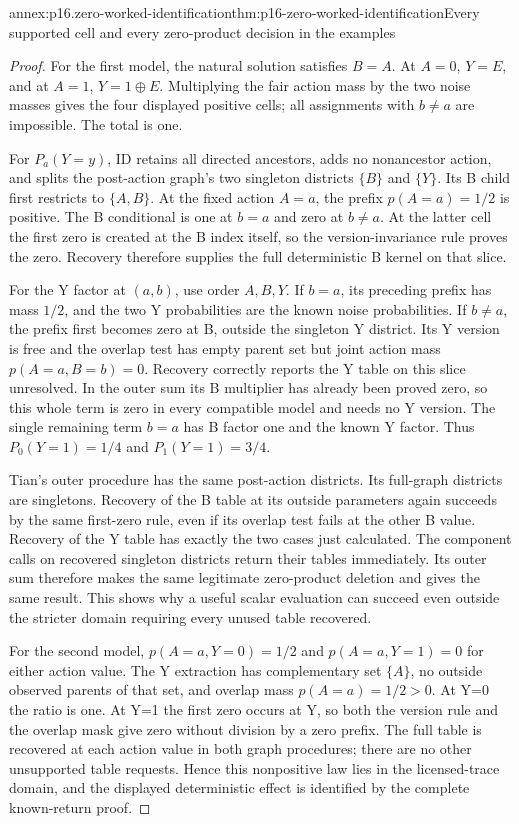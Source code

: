 \begin{annexitem}{annex:p16.zero-worked-identification}{thm:p16-zero-worked-identification}{Every supported cell and every zero-product decision in the examples}
\begin{proof}
For the first model, the natural solution satisfies \(B=A\).
At \(A=0\), \(Y=E\), and at \(A=1\), \(Y=1\oplus E\).
Multiplying the fair action mass by the two noise masses gives
the four displayed positive cells; all assignments with \(b\ne a\)
are impossible. The total is one.

For \(P_a(Y=y)\), ID retains all directed ancestors, adds
no nonancestor action, and splits the post-action graph's two
singleton districts \(\{B\}\) and \(\{Y\}\). Its B
child first restricts to \(\{A,B\}\). At the fixed action
\(A=a\), the prefix \(p(A=a)=1/2\) is positive. The
B conditional is one at \(b=a\) and zero at \(b\ne a\).
At the latter cell the first zero is created at the B index
itself, so the version-invariance rule proves the zero. Recovery
therefore supplies the full deterministic B kernel on that slice.

For the Y factor at \((a,b)\), use order \(A,B,Y\).
If \(b=a\), its preceding prefix has mass \(1/2\), and
the two Y probabilities are the known noise probabilities.
If \(b\ne a\), the prefix first becomes zero at B, outside
the singleton Y district. Its Y version is free and the overlap
test has empty parent set but joint action mass
\(p(A=a,B=b)=0\). Recovery correctly reports the Y table
on this slice unresolved. In the outer sum its B multiplier
has already been proved zero, so this whole term is zero in
every compatible model and needs no Y version. The single
remaining term \(b=a\) has B factor one and the known Y
factor. Thus \(P_0(Y=1)=1/4\) and \(P_1(Y=1)=3/4\).

Tian's outer procedure has the same post-action districts. Its
full-graph districts are singletons. Recovery of the B table at
its outside parameters again succeeds by the same first-zero
rule, even if its overlap test fails at the other B value.
Recovery of the Y table has exactly the two cases just calculated.
The component calls on recovered singleton districts return their
tables immediately. Its outer sum therefore makes the same
legitimate zero-product deletion and gives the same result.
This shows why a useful scalar evaluation can succeed even
outside the stricter domain requiring every unused table recovered.

For the second model, \(p(A=a,Y=0)=1/2\) and
\(p(A=a,Y=1)=0\) for either action value. The Y extraction
has complementary set \(\{A\}\), no outside observed
parents of that set, and overlap mass \(p(A=a)=1/2>0\).
At Y=0 the ratio is one. At Y=1 the first zero occurs at Y,
so both the version rule and the overlap mask give zero without
division by a zero prefix. The full table is recovered at each
action value in both graph procedures; there are no other
unsupported table requests. Hence this nonpositive law lies in
the licensed-trace domain, and the displayed deterministic effect
is identified by the complete known-return proof.


\end{proof}
\end{annexitem}
